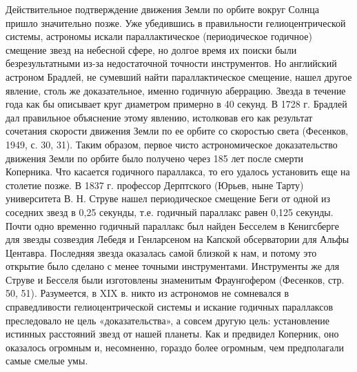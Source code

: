 Действительное подтверждение движения Земли по орбите вокруг Солнца
пришло значительно позже. Уже убедившись в правильности
гелиоцентрической системы, астрономы искали параллактическое
(периодическое годичное) смещение звезд на небесной сфере, но долгое
время их поиски были безрезультатными из-за недостаточной точности
инструментов. Но английский астроном Брадлей, не сумевший найти
параллактическое смещение, нашел другое явление, столь же
доказательное, именно годичную аберрацию. Звезда в течение года как бы
описывает круг диаметром примерно в 40 секунд. В 1728 г. Брадлей дал
правильное объяснение этому явлению, истолковав его как результат
сочетания скорости движения Земли по ее орбите со скоростью света
(Фесенков, 1949, с. 30, 31). Таким образом, первое чисто
астрономическое доказательство движения Земли по орбите было получено
через 185 лет после смерти Коперника. Что касается годичного
параллакса, то его удалось установить еще на столетие позже. В 1837 г.
профессор Дерптского (Юрьев, ныне Тарту) университета В. Н. Струве
нашел периодическое смещение Беги от одной из соседних звезд в 0,25
секунды, т.е. годичный параллакс равен 0,125 секунды. Почти одно
временно годичный параллакс был найден Бесселем в Кенигсберге для
звезды созвездия Лебедя и Генларсеном на Капской обсерватории для
Альфы Центавра. Последняя звезда оказалась самой близкой к нам, и
потому это открытие было сделано с менее точными инструментами.
Инструменты же для Струве и Бесселя были изготовлены знаменитым
Фраунгофером (Фесенков, стр. 50, 51). Разумеется, в XIX в. никто из
астрономов не сомневался в справедливости гелиоцентрической системы и
искание годичных параллаксов преследовало не цель «доказательства», а
совсем другую цель: установление истинных расстояний звезд от нашей
планеты. Как и предвидел Коперник, оно оказалось огромным и,
несомненно, гораздо более огромным, чем предполагали самые смелые умы.

